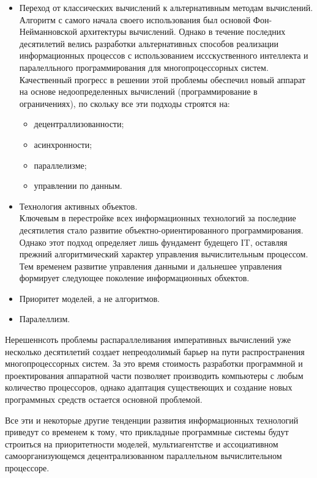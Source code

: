 \documentclass[a4paper,12pt]{report}
\begin{document}
	\begin{itemize}
		\item Переход от классических вычислений к альтернативным методам
			вычислений. \\
			Алгоритм с самого начала своего использования был основой
			Фон-Нейманновской архитектуры вычислений. Однако в течение последних
			десятилетий велись разработки альтернативных способов реализации
			информационных процессов с использованием иссскуственного интеллекта и
			паралелльного программирования для многопроцессорных систем. Качественный
			прогресс в решении этой проблемы обеспечил новый аппарат на основе
			недоопределенных вычислений (программирование в ограничениях), по скольку
			все эти подходы строятся на:
			\begin{itemize}
				\item децентраллизованности;
				\item асинхронности;
				\item параллелизме;
				\item управлении по данным.
			\end{itemize}
		\item Технология активных объектов. \\
			Ключевым в перестройке всех информационных технологий за последние
			десятилетия стало развитие объектно-ориентированного программирования.
			Однако этот подход определяет лишь фундамент будещего IT, оставляя
			прежний алгоритмический характер управления вычислительным процессом. Тем
			временем развитие управления данными и дальнешее управления формирует
			следующее поколение информационных обхектов.
		\item Приоритет моделей, а не алгоритмов.
		\item Паралеллизм. \\
	\end{itemize}

	Нерешеннсоть проблемы распараллеливания императивных вычислений уже несколько
	десятилетий создает непреодолимый барьер на пути распространения
	многопроцессорных систем. За это время стоимость разработки программной и
	проектирования аппаратной части позволяет производить компьютеры с любым
	количество процессоров, однако адаптация существеющих и создание
	новых программных средств остается основной проблемой.\par
	Все эти и некоторые другие тенденции развития информационных технологий
	приведут со временем к тому, что прикладные программные системы будут
	строиться на приоритетности моделей, мультиагентстве и ассоциативном
	самоорганизующемся децентрализованном параллельном вычислительном процессоре.
\end{document}
